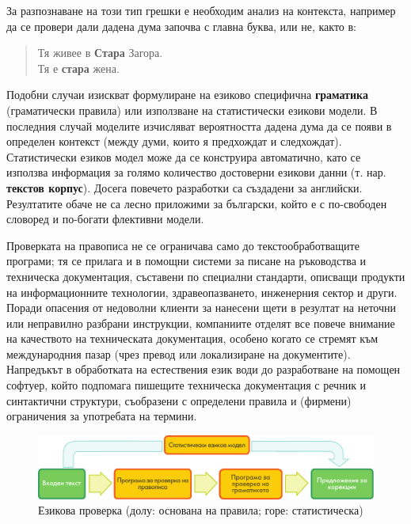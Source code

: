 \begin{multicols}{2}
  За разпознаване на този тип грешки е необходим анализ на контекста, например да се провери дали дадена дума започва с главна буква, или не, както в: 

  \begin{quote}
    Тя живее в \textbf{Стара} Загора.\\
    Тя е \textbf{стара} жена.
  \end{quote}

  Подобни случаи изискват формулиране на езиково специфична \textbf{граматика} (граматически правила) или използване на статистически езикови модели. В последния случай моделите изчисляват вероятността дадена дума да се появи в определен контекст (между думи, които я предхождат и следхождат). 
  Статистически езиков модел може да се конструира автоматично, като се използва информация за голямо количество достоверни езикови данни (т. нар. \textbf{текстов корпус}). Досега повечето разработки са създадени за английски. Резултатите обаче не са лесно приложими за български, който е с по-свободен словоред и по-богати флективни модели. 

  Проверката на правописа не се ограничава само до текстообработващите програми; тя се прилага и в помощни системи за писане на ръководства и техническа документация, съставени по специални стандарти, описващи продукти на информационните технологии, здравеопазването, инженерния сектор и други. 
  Поради опасения от недоволни клиенти за нанесени щети в резултат на неточни или неправилно разбрани инструкции, компаниите отделят все повече внимание на качеството на техническата документация, особено когато се стремят към международния пазар (чрез превод или локализиране на документите).
  Напредъкът в обработката на естествения език води до разработване на помощен софтуер, който подпомага пишещите техническа документация с речник и синтактични структури, съобразени с определени правила и (фирмени) ограничения за употребата на термини. 

  \begin{figure}[htb]
    \center
    \includegraphics[width=\textwidth]{../_media/bulgarian/language_checking}
    \caption{Езикова проверка (долу: основана на правила; горе: статистическа)}
    \label{fig:langcheckingaarch_de}
  \end{figure}


\end{multicols}
